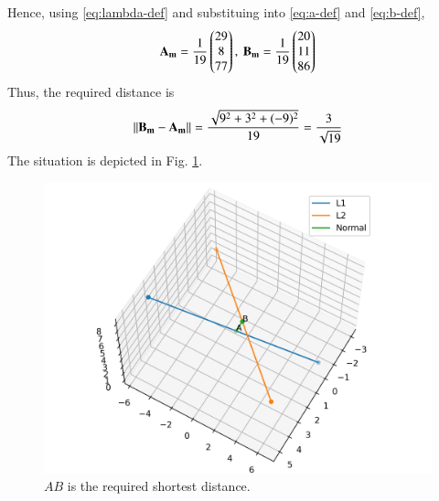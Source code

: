\documentclass[journal,12pt,twocolumn]{IEEEtran}
\renewcommand{\vec}[1]{\boldsymbol{\mathbf{#1}}}
\begin{document}
\begin{enumerate}
    Hence, using \eqref{eq:lambda-def} and substituing into \eqref{eq:a-def} and \eqref{eq:b-def},
    \begin{align}
        \vec{A_m} = \frac{1}{19}\myvec{29\\8\\77},\ \vec{B_m} = \frac{1}{19}\myvec{20\\11\\86}
    \end{align}
    Thus, the required distance is
    \begin{align}
        \norm{\vec{B_m}-\vec{A_m}} = \frac{\sqrt{9^2 +3^2 +(-9)^2}}{19} = \frac{3}{\sqrt{19}}
    \end{align}
    The situation is depicted in Fig. \ref{fig:skew}.

    \begin{figure}[!ht]
        \centering
        \includegraphics[width=\columnwidth]{figs/skew.png}
        \caption{$AB$ is the required shortest distance.}
        \label{fig:skew}
    \end{figure}
\end{enumerate}
\end{document}
